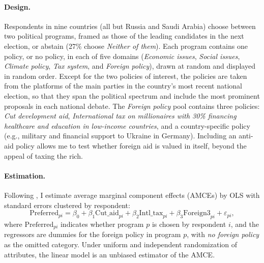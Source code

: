 \documentclass[12pt,english]{article}
\begin{document}
\paragraph{Design.} Respondents in nine countries (all but Russia and Saudi Arabia) choose between two political programs, framed as those of the leading candidates in the next election, or abstain (27\% choose \textit{Neither of them}). Each program contains one policy, or no policy, in each of five domains (\textit{Economic issues}, \textit{Social issues}, \textit{Climate policy}, \textit{Tax system}, and \textit{Foreign policy}), drawn at random and displayed in random order. Except for the two policies of interest, the policies are taken from the platforms of the main parties in the country's most recent national election, so that they span the political spectrum and include the most prominent proposals in each national debate. The \textit{Foreign policy} pool contains three policies: \textit{Cut development aid}, \textit{International tax on millionaires with 30\% financing healthcare and education in low-income countries}, and a country-specific policy (e.g., military and financial support to Ukraine in Germany). Including an anti-aid policy allows me to test whether foreign aid is valued in itself, beyond the appeal of taxing the rich.

\paragraph{Estimation.} Following \cite{hainmueller_causal_2014}, I estimate average marginal component effects (AMCEs) by OLS with standard errors clustered by respondent:
\begin{equation}\label{eq:conjoint}
\text{Preferred}_{pi} = \beta_0 + \beta_1 \text{Cut\_aid}_{pi} + \beta_2 \text{Intl\_tax}_{pi} + \beta_3 \text{Foreign3}_{pi} + \varepsilon_{pi},
\end{equation}
where $\text{Preferred}_{pi}$ indicates whether program $p$ is chosen by respondent $i$, and the regressors are dummies for the foreign policy in program $p$, with \textit{no foreign policy} as the omitted category. Under uniform and independent randomization of attributes, the linear model is an unbiased estimator of the AMCE.
\end{document}
